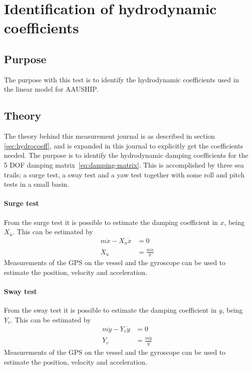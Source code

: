 \chapter{Identification of hydrodynamic coefficients}
\label{app:damping}

\section{Purpose}
The purpose with this test is to
identify the hydrodynamic coefficients used in the linear model for
AAUSHIP.

\section{Theory} The theory behind this measurement journal is as
described in section \ref{sec:hydrocoeff}, and is expanded in this
journal to explicitly get the coefficients needed. The purpose is to
identify the hydrodynamic damping coefficients for the 5 \ac{DOF} damping
matrix~\vref{eq:damping-matrix}. This is accomplished by
three sea trails; a surge test, a sway test and a yaw
test together with some roll and pitch tests in a small basin.






\subsubsection{Surge test}
From the surge test it is possible to estimate the damping coefficient in $x$, being $X_u$. This can be estimated by
\begin{align}
m \ddot x - X_u \dot x &= 0\\
X_u &= \frac{m \ddot x}{\dot x}
\end{align}
Measurements of the \ac{GPS} on the vessel and the gyroscope can be used to estimate the position, velocity and acceleration.\\

\subsubsection{Sway test}
From the sway test it is possible to estimate the damping coefficient in $y$, being $Y_v$. This can be estimated by
\begin{align}
m \ddot y - Y_v \dot y &= 0\\
Y_v &= \frac{m \ddot y}{\dot y}
\end{align}
Measurements of the \ac{GPS} on the vessel and the gyroscope can be used to estimate
the position, velocity and acceleration.\\

